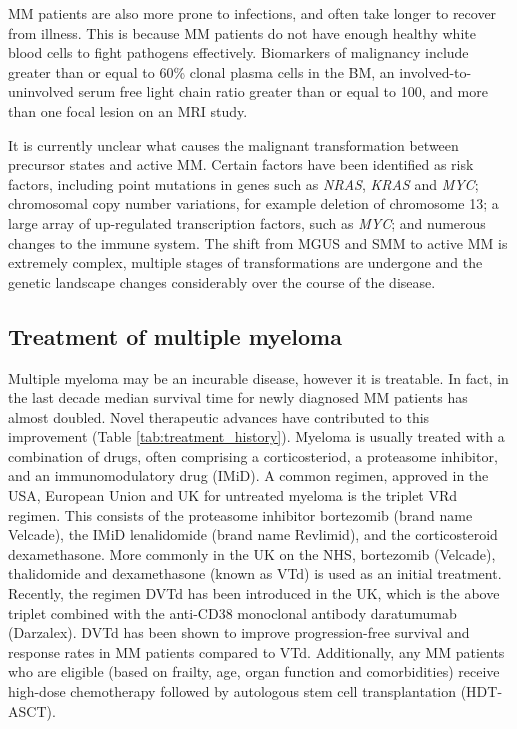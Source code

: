 \noindent
MM patients are also more prone to infections, and often take longer to recover from illness.
This is because MM patients do not have enough healthy white blood cells to fight pathogens effectively.
Biomarkers of malignancy include greater than or equal to 60\% clonal plasma cells in the BM, an involved-to-uninvolved serum free light chain ratio greater than or equal to 100, and more than one focal lesion on an MRI study\cite{rajkumar2014international}.

It is currently unclear what causes the malignant transformation between precursor states and active MM\@.
Certain factors have been identified as risk factors, including point mutations in genes such as \textit{NRAS}, \textit{KRAS} and \textit{MYC}; chromosomal copy number variations, for example deletion of chromosome 13; a large array of up-regulated transcription factors, such as \textit{MYC}; and numerous changes to the immune system\cite{korde2011monoclonal, mccachren2021co}.
The shift from MGUS and SMM to active MM is extremely complex, multiple stages of transformations are undergone and the genetic landscape changes considerably over the course of the disease.

\subsection{Treatment of multiple myeloma}\label{subsec:mm_treatment}
Multiple myeloma may be an incurable disease, however it is treatable.
In fact, in the last decade median survival time for newly diagnosed MM patients has almost doubled\cite{kazandjian2016look}.
Novel therapeutic advances have contributed to this improvement (Table \ref{tab:treatment_history}).
Myeloma is usually treated with a combination of drugs, often comprising a corticosteriod, a proteasome inhibitor, and an immunomodulatory drug (IMiD).
A common regimen, approved in the USA, European Union and UK for untreated myeloma is the triplet VRd regimen.
This consists of the proteasome inhibitor bortezomib (brand name Velcade), the IMiD lenalidomide (brand name Revlimid), and the corticosteroid dexamethasone.
More commonly in the UK on the NHS, bortezomib (Velcade), thalidomide and dexamethasone (known as VTd) is used as an initial treatment.
Recently, the regimen DVTd has been introduced in the UK, which is the above triplet combined with the anti-CD38 monoclonal antibody daratumumab (Darzalex).
DVTd has been shown to improve progression-free survival and response rates in MM patients compared to VTd.
Additionally, any MM patients who are eligible (based on frailty, age, organ function and comorbidities) receive high-dose chemotherapy followed by autologous stem cell transplantation (HDT-ASCT).

